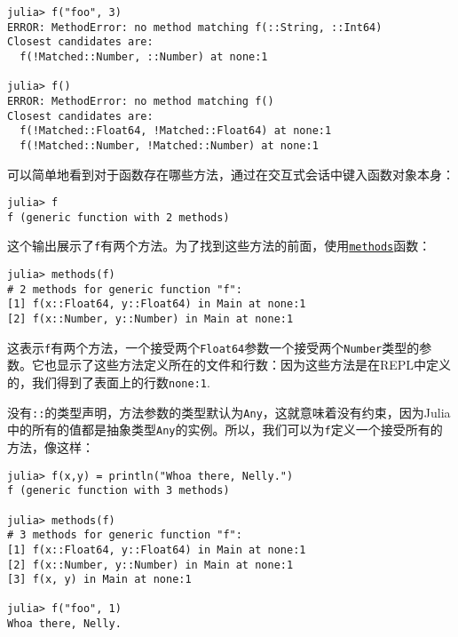 \begin{verbatim}
julia> f("foo", 3)
ERROR: MethodError: no method matching f(::String, ::Int64)
Closest candidates are:
  f(!Matched::Number, ::Number) at none:1

julia> f()
ERROR: MethodError: no method matching f()
Closest candidates are:
  f(!Matched::Float64, !Matched::Float64) at none:1
  f(!Matched::Number, !Matched::Number) at none:1
\end{verbatim}



可以简单地看到对于函数存在哪些方法，通过在交互式会话中键入函数对象本身：




\begin{verbatim}
julia> f
f (generic function with 2 methods)
\end{verbatim}



这个输出展示了\texttt{f}有两个方法。为了找到这些方法的前面，使用\hyperlink{3025953302266245919}{\texttt{methods}}函数：




\begin{verbatim}
julia> methods(f)
# 2 methods for generic function "f":
[1] f(x::Float64, y::Float64) in Main at none:1
[2] f(x::Number, y::Number) in Main at none:1
\end{verbatim}



这表示\texttt{f}有两个方法，一个接受两个\texttt{Float64}参数一个接受两个\texttt{Number}类型的参数。它也显示了这些方法定义所在的文件和行数：因为这些方法是在REPL中定义的，我们得到了表面上的行数\texttt{none:1}.



没有\texttt{::}的类型声明，方法参数的类型默认为\texttt{Any}，这就意味着没有约束，因为Julia中的所有的值都是抽象类型\texttt{Any}的实例。所以，我们可以为\texttt{f}定义一个接受所有的方法，像这样：




\begin{verbatim}
julia> f(x,y) = println("Whoa there, Nelly.")
f (generic function with 3 methods)

julia> methods(f)
# 3 methods for generic function "f":
[1] f(x::Float64, y::Float64) in Main at none:1
[2] f(x::Number, y::Number) in Main at none:1
[3] f(x, y) in Main at none:1

julia> f("foo", 1)
Whoa there, Nelly.
\end{verbatim}



